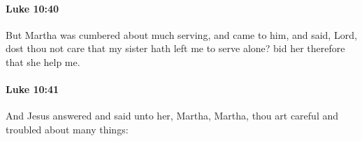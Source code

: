 		\paragraph{Luke 10:40} %
			\label{LUKE-10-40}

			But Martha was cumbered about much serving, and came to him, and said, Lord, dost thou not care that my sister hath left me to serve alone? bid her therefore that she help me.

			\begin{framed}
			\scriptsize
				\begin{compactdesc}
					\item[SBLG] 
				\end{compactdesc}
			\end{framed}

		\paragraph{Luke 10:41} %
			\label{LUKE-10-41}

			And Jesus answered and said unto her, Martha, Martha, thou art careful and troubled about many things:

